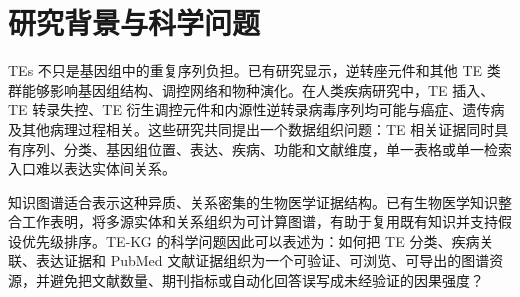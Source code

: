 \documentclass[12pt,a4paper,UTF8]{ctexart}
\begin{document}
\cover
\clearpage

\thispagestyle{empty}
\begin{abstract}
转座元件（transposable elements, TEs）占据人类基因组的重要部分，并通过插入、重排、调控元件供给和转录调控等方式参与基因组演化与疾病相关过程\cite{lander2001human,cordaux2009retrotransposons,chuong2017regulatory,bourque2018ten}。然而，TE 相关证据通常分散在基因组注释、表达数据、文献摘要、疾病关联和人工整理的知识条目中，研究者难以在同一界面内追踪“TE--分子实体--疾病--文献证据”的完整证据链。本 proposal 以已经实现的 TE-KG 本地 pilot resource 为基础，提出一个面向 TE 疾病机制研究的知识图谱资源建设方案。当前 \texttt{tekg3} 运行时已经由 Neo4j、PHP API、浏览器 G6 图谱、MySQL 表达摘要和 PubMed 元数据增强流程共同支撑；只读检查确认 live Neo4j 统计接口包含 11,415 个节点和 13,696 条关系，代表性 TE 条目 L1HS、AluJb 和 SVA 可解析。方案的核心假设是：若将 TE taxonomy、疾病关联、表达入口和 PubMed 证据元数据整合为可追踪、可导出、可验证的知识图谱，TE 相关机制假设的发现和证据审查将比孤立页面或人工检索更透明、更可复用。
\end{abstract}

\clearpage
\tableofcontents

\clearpage
{}

\section{研究背景与科学问题}

TEs 不只是基因组中的重复序列负担。已有研究显示，逆转座元件和其他 TE 类群能够影响基因组结构、调控网络和物种演化\cite{cordaux2009retrotransposons,chuong2017regulatory,bourque2018ten}。在人类疾病研究中，TE 插入、TE 转录失控、TE 衍生调控元件和内源性逆转录病毒序列均可能与癌症、遗传病及其他病理过程相关\cite{burns2017cancer,payer2019genetic}。这些研究共同提出一个数据组织问题：TE 相关证据同时具有序列、分类、基因组位置、表达、疾病、功能和文献维度，单一表格或单一检索入口难以表达实体间关系。

知识图谱适合表示这种异质、关系密集的生物医学证据结构。已有生物医学知识整合工作表明，将多源实体和关系组织为可计算图谱，有助于复用既有知识并支持假设优先级排序\cite{himmelstein2017hetionet}。TE-KG 的科学问题因此可以表述为：如何把 TE 分类、疾病关联、表达证据和 PubMed 文献证据组织为一个可验证、可浏览、可导出的图谱资源，并避免把文献数量、期刊指标或自动化回答误写成未经验证的因果强度？
\end{document}
